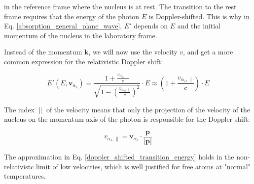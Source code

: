 \documentclass{article}
\begin{document}
in the reference frame where the nucleus is at rest. 
The transition to the rest frame requires that the energy of the photon $E$ is Doppler-shifted.
This is why in Eq. \ref{absorption_general_plane_wave}, $E'$ depends on $E$ and the initial momentum of the nucleus in the laboratory frame.

%

Instead of the momentum $\mathbf{k}$, we will now use the velocity $v$, and get a more common expression for the relativistic Doppler shift:


\begin{equation}
	\label{doppler_shifted_transition_energy}
	E' (E, \mathbf{v}_{\alpha_s}) = \frac{1 + \frac{v_{\alpha_s, \parallel}}{c}}{\sqrt{1 - \left( \frac{v_{\alpha_s, \parallel}}{c} \right)^2}} \cdot E \approx \left( 1 + \frac{v_{\alpha_s, \parallel}}{c} \right) \cdot E
\end{equation}

The index $\parallel$ of the velocity means that only the projection of the velocity of the nucleus on the momentum axis of the photon is responsible for the Doppler shift:

\begin{equation}
	\label{v_parallel}
	v_{\alpha_s, \parallel} = \mathbf{v}_{\alpha_s} \cdot \frac{\mathbf{p}}{\left| \mathbf{p} \right|}
\end{equation}

The approximation in Eq. \ref{doppler_shifted_transition_energy} holds in the non-relativistc limit of low velocities, which is well justified for free atoms at "normal" temperatures.
\end{document}
